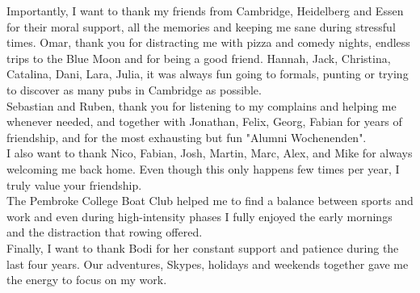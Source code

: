 \begin{acknowledgements}
\newpage
\thispagestyle{empty}
 
Importantly, I want to thank my friends from Cambridge, Heidelberg and Essen for their moral support, all the memories and keeping me sane during stressful times. Omar, thank you for distracting me with pizza and comedy nights, endless trips to the Blue Moon and for being a good friend. Hannah, Jack, Christina, Catalina, Dani, Lara, Julia, it was always fun going to formals, punting or trying to discover as many pubs in Cambridge as possible.\\

Sebastian and Ruben, thank you for listening to my complains and helping me whenever needed, and together with Jonathan, Felix, Georg, Fabian for years of friendship, and for the most exhausting but fun "Alumni Wochenenden".  \\

I also want to thank Nico, Fabian, Josh, Martin, Marc, Alex, and Mike for always welcoming me back home. Even though this only happens few times per year, I truly value your friendship. \\

The Pembroke College Boat Club helped me to find a balance between sports and work and even during high-intensity phases I fully enjoyed the early mornings and the distraction that rowing offered. \\

Finally, I want to thank Bodi for her constant support and patience during the last four years. Our adventures, Skypes, holidays and weekends together gave me the energy to focus on my work.

\end{acknowledgements}
